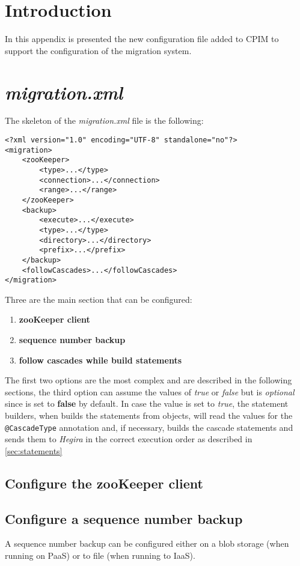 \section{Introduction}
In this appendix is presented the new configuration file added to CPIM to support the configuration of the migration system.

\section{\textit{migration.xml}}
The skeleton of the \textit{migration.xml} file is the following:

\begin{verbatim}
<?xml version="1.0" encoding="UTF-8" standalone="no"?>
<migration>
    <zooKeeper>
        <type>...</type>
        <connection>...</connection>
        <range>...</range>
    </zooKeeper>
    <backup>
        <execute>...</execute>
        <type>...</type>
        <directory>...</directory>
        <prefix>...</prefix>
    </backup>
    <followCascades>...</followCascades>
</migration>
\end{verbatim}

\noindent Three are the main section that can be configured:
\begin{enumerate}
\item \textbf{zooKeeper client}
\item \textbf{sequence number backup}
\item \textbf{follow cascades while build statements}
\end{enumerate}

The first two options are the most complex and are described in the following sections, the third option can assume the values of \textit{true} or \textit{false} but is \textit{optional} since is set to \textbf{false} by default.
In case the value is set to \textit{true}, the statement builders, when builds the statements from objects, will read the values for the \texttt{@CascadeType} annotation and, if necessary, builds the cascade statements and sends them to \textit{Hegira} in the correct execution order as described in \ref{sec:statements} 

\subsection{Configure the zooKeeper client}

\subsection{Configure a sequence number backup}
A sequence number backup can be configured either on a blob storage (when running on PaaS) or to file (when running to IaaS).

